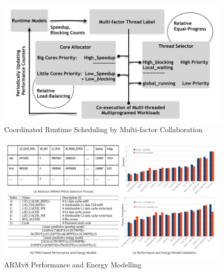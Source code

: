 
\begin{figure}
\centering
\includegraphics[scale=0.5]{figures/COLAB_M.pdf}
\caption{Coordinated Runtime Scheduling by Multi-factor Collaboration}
\label{figure:f2}
\end{figure} 

\begin{figure}
\centering
\includegraphics[scale=0.25]{figures/arm_model.pdf}
\caption{ARMv8 Performance and Energy Modelling}
\label{arm_model}
\end{figure}
